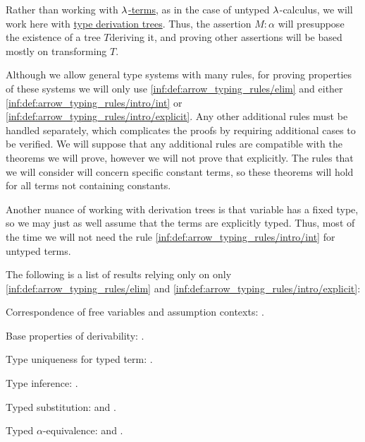 \begin{remark}\label{rem:arrow_typing_rules_only}
  Rather than working with \hyperref[def:lambda_term]{\( \mathrm{\lambda} \)-terms}, as in the case of untyped \( \mathrm{\lambda} \)-calculus, we will work here with \hyperref[def:type_derivation_tree]{type derivation trees}. Thus, the assertion \( M: \alpha \) will presuppose the existence of a tree \( T \)deriving it, and proving other assertions will be based mostly on transforming \( T \).

  Although we allow general type systems with many rules, for proving properties of these systems we will only use \ref{inf:def:arrow_typing_rules/elim} and either \ref{inf:def:arrow_typing_rules/intro/int} or \ref{inf:def:arrow_typing_rules/intro/explicit}. Any other additional rules must be handled separately, which complicates the proofs by requiring additional cases to be verified. We will suppose that any additional rules are compatible with the theorems we will prove, however we will not prove that explicitly. The rules that we will consider will concern specific constant terms, so these theorems will hold for all terms not containing constants.

  Another nuance of working with derivation trees is that variable has a fixed type, so we may just as well assume that the terms are explicitly typed. Thus, most of the time we will not need the rule \ref{inf:def:arrow_typing_rules/intro/int} for untyped terms.

  The following is a list of results relying only on only \ref{inf:def:arrow_typing_rules/elim} and \ref{inf:def:arrow_typing_rules/intro/explicit}:
  \begin{thmenum}
     Correspondence of free variables and assumption contexts: .

     Base properties of derivability: .

     Type uniqueness for typed term: .

     Type inference: .

     Typed substitution:  and .

     Typed \( \alpha \)-equivalence:  and .
  \end{thmenum}
\end{remark}

